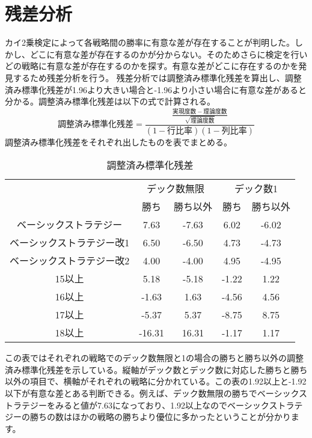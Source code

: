 \section{残差分析}
カイ2乗検定によって各戦略間の勝率に有意な差が存在することが判明した。しかし、どこに有意な差が存在するのかが分からない。そのためさらに検定を行いどの戦略に有意な差が存在するのかを探す。有意な差がどこに存在するのかを発見するため残差分析を行う。
残差分析では調整済み標準化残差を算出し、調整済み標準化残差が1.96より大きい場合と-1.96より小さい場合に有意な差があると分かる。調整済み標準化残差は以下の式で計算される。
\begin{equation} 調整済み標準化残差 =  \frac{\frac{実現度数 - 理論度数}{\sqrt{理論度数}}}{(1-行比率)(1-列比率)} \end{equation}
調整済み標準化残差をそれぞれ出したものを表でまとめる。
\begin{table}[H]
 \begin{center}
  \begin{tabular}{|c|c|c|c|c|}
    \hline
     & \multicolumn{2}{c|}{デック数無限} & \multicolumn{2}{c|}{デック数1} \\
    \cline{2-5} & 勝ち & 勝ち以外 & 勝ち & 勝ち以外 \\
    \hline ベーシックストラテジー & 7.63 & -7.63 & 6.02 & -6.02  \\
    \hline ベーシックストラテジー改1 & 6.50 & -6.50 & 4.73 & -4.73  \\
    \hline ベーシックストラテジー改2 & 4.00 & -4.00 & 4.95 & -4.95  \\
    \hline 15以上 & 5.18 & -5.18 & -1.22 & 1.22  \\
    \hline 16以上 & -1.63 & 1.63 & -4.56 & 4.56  \\
    \hline 17以上 & -5.37 & 5.37 & -8.75 & 8.75  \\
    \hline 18以上 & -16.31 & 16.31 & -1.17 & 1.17  \\
    \hline
  \end{tabular}
 \end{center}
 \caption{調整済み標準化残差}
\end{table}
この表ではそれぞれの戦略でのデック数無限と1の場合の勝ちと勝ち以外の調整済み標準化残差を示している。縦軸がデック数とデック数に対応した勝ちと勝ち以外の項目で、横軸がそれぞれの戦略に分かれている。この表の1.92以上と-1.92以下が有意な差とある判断できる。例えば、デック数無限の勝ちでベーシックストラテジーをみると値が7.63になっており、1.92以上なのでベーシックストラテジーの勝ちの数はほかの戦略の勝ちより優位に多かったということが分かります。\\
